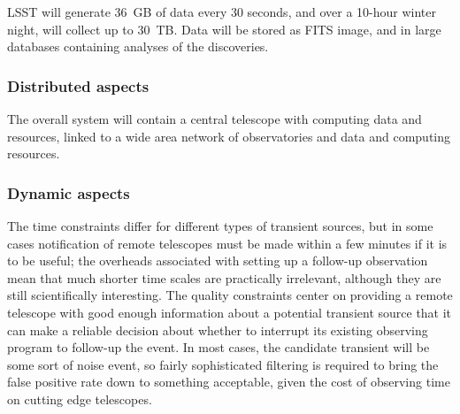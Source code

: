
LSST will generate 36~GB of data every 30 seconds, and over a 10-hour winter night, will collect up to 30~TB.  Data will be stored as FITS image, and in large databases containing analyses of  the discoveries.

 \subsubsection*{Distributed aspects}



The overall system will contain a central telescope with computing data and resources, linked to a wide area network of observatories and data and computing resources.

 \subsubsection*{Dynamic aspects}



The time constraints differ for different types of transient sources, but in some
cases notification of remote telescopes must be made within a few minutes if it is to be useful; the
overheads associated with setting up a follow-up observation mean that much
shorter time scales are practically irrelevant, although they are still
scientifically interesting. The quality constraints center on providing a
remote telescope with good enough information about a potential transient source that
it can make a reliable decision about whether to interrupt its existing
observing program to follow-up the event. In most cases, the candidate
transient will be some sort of noise event, so fairly sophisticated filtering is
required to bring the false positive rate down to something acceptable, given
the cost of observing time on cutting edge telescopes.

